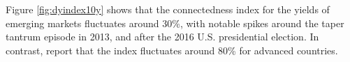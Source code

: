 \begin{appendices}

Figure \ref{fig:dyindex10y} shows that the connectedness index for the yields of emerging markets fluctuates around 30\%, %
with notable spikes around the taper tantrum episode in 2013,
and after the 2016 U.S. presidential election.
In contrast, \cite{ACDM:2019} report that the index fluctuates around 80\% for advanced countries.


\end{appendices}
